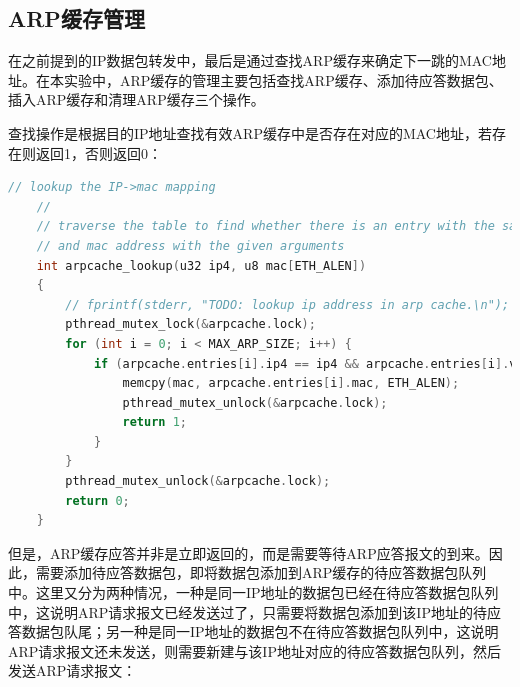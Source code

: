 \documentclass[UTF8]{report}
\begin{document}
\subsection{ARP缓存管理}

在之前提到的IP数据包转发中，最后是通过查找ARP缓存来确定下一跳的MAC地址。在本实验中，ARP缓存的管理主要包括查找ARP缓存、添加待应答数据包、插入ARP缓存和清理ARP缓存三个操作。

查找操作是根据目的IP地址查找有效ARP缓存中是否存在对应的MAC地址，若存在则返回1，否则返回0：

\begin{lstlisting}[language=C]
    // lookup the IP->mac mapping
    //
    // traverse the table to find whether there is an entry with the same IP
    // and mac address with the given arguments
    int arpcache_lookup(u32 ip4, u8 mac[ETH_ALEN])
    {
        // fprintf(stderr, "TODO: lookup ip address in arp cache.\n");
        pthread_mutex_lock(&arpcache.lock);
        for (int i = 0; i < MAX_ARP_SIZE; i++) {
            if (arpcache.entries[i].ip4 == ip4 && arpcache.entries[i].valid) {
                memcpy(mac, arpcache.entries[i].mac, ETH_ALEN);
                pthread_mutex_unlock(&arpcache.lock);
                return 1;
            }
        }
        pthread_mutex_unlock(&arpcache.lock);
        return 0;
    }
\end{lstlisting}

但是，ARP缓存应答并非是立即返回的，而是需要等待ARP应答报文的到来。因此，需要添加待应答数据包，即将数据包添加到ARP缓存的待应答数据包队列中。这里又分为两种情况，一种是同一IP地址的数据包已经在待应答数据包队列中，这说明ARP请求报文已经发送过了，只需要将数据包添加到该IP地址的待应答数据包队尾；另一种是同一IP地址的数据包不在待应答数据包队列中，这说明ARP请求报文还未发送，则需要新建与该IP地址对应的待应答数据包队列，然后发送ARP请求报文：
\end{document}
